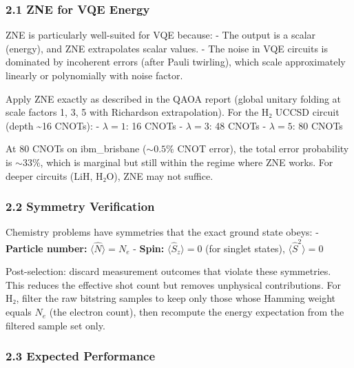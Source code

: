 \documentclass[
  11pt,
]{report}
\begin{document}
\subsubsection{2.1 ZNE for VQE Energy}\label{zne-for-vqe-energy}

ZNE is particularly well-suited for VQE because: - The output is a
scalar (energy), and ZNE extrapolates scalar values. - The noise in VQE
circuits is dominated by incoherent errors (after Pauli twirling), which
scale approximately linearly or polynomially with noise factor.

Apply ZNE exactly as described in the QAOA report (global unitary
folding at scale factors 1, 3, 5 with Richardson extrapolation). For the
H₂ UCCSD circuit (depth \textasciitilde16 CNOTs): - \(\lambda = 1\): 16
CNOTs - \(\lambda = 3\): 48 CNOTs - \(\lambda = 5\): 80 CNOTs

At 80 CNOTs on ibm\_brisbane (\(\sim 0.5\%\) CNOT error), the total
error probability is \(\sim 33\%\), which is marginal but still within
the regime where ZNE works. For deeper circuits (LiH, H₂O), ZNE may not
suffice.

\subsubsection{2.2 Symmetry Verification}\label{symmetry-verification}

Chemistry problems have symmetries that the exact ground state obeys: -
\textbf{Particle number:} \(\langle\hat{N}\rangle = N_e\) -
\textbf{Spin:} \(\langle\hat{S}_z\rangle = 0\) (for singlet states),
\(\langle\hat{S}^2\rangle = 0\)

Post-selection: discard measurement outcomes that violate these
symmetries. This reduces the effective shot count but removes unphysical
contributions. For H₂, filter the raw bitstring samples to keep only
those whose Hamming weight equals \(N_e\) (the electron count), then
recompute the energy expectation from the filtered sample set only.

\subsubsection{2.3 Expected Performance}\label{expected-performance}
\end{document}

